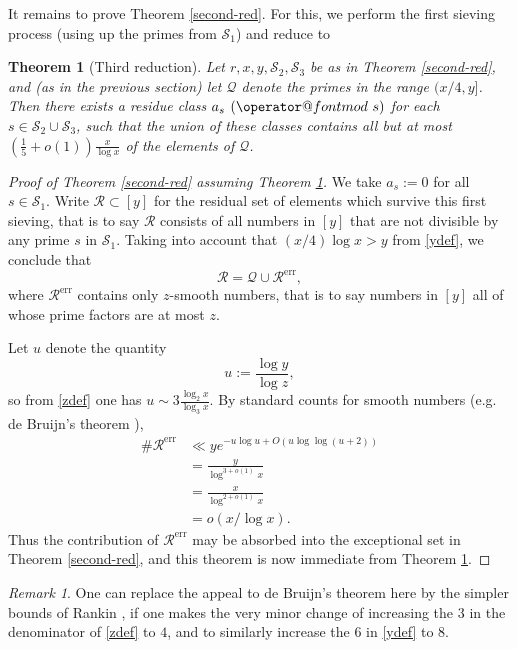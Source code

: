 \documentclass[11pt]{amsart}
\makeatletter
\numberwithin{equation}{section}  %
\theoremstyle{remark}
\newtheorem{remark}{Remark}
\theoremstyle{plain}
\newtheorem{thm}{Theorem}
\numberwithin{equation}{section}
\renewcommand{\pmod}[1]{\allowbreak\mkern7mu({\operator@font mod}\,\,#1)}
\renewcommand{\(}{\left(}
\renewcommand{\)}{\right)}
\newcommand{\asym}{\sim}   %
\newcommand{\QQ}{\mathcal{Q}}
\newcommand{\cS}{\mathcal{S}}
\newcommand{\cR}{\mathcal{R}}
\newcommand{\err}{\operatorname{err}}
\makeatother
\begin{document}
It remains to prove Theorem \ref{second-red}.  For this, we perform the first sieving process (using up the primes from $\cS_1$) and reduce to

\begin{thm}[Third reduction]\label{third-red}  Let $r,x,y,\cS_2,\cS_3$
  be as in Theorem \ref{second-red}, and (as in the previous section)
  let $\QQ$ denote the primes in the range $(x/4,y]$.  Then there
    exists a residue class $a_s \pmod s$ for each $s \in \cS_2 \cup
    \cS_3$, such that the union of these classes contains all but at most $(\frac{1}{5} + o(1)) \frac{x}{\log x}$ of the elements of $\QQ$.
\end{thm}

\begin{proof}[Proof of Theorem \ref{second-red} assuming Theorem \ref{third-red}]  We take $a_s := 0$ for all $s\in \cS_1$.
Write $\cR \subset [y]$ for the residual set of elements
which survive this first sieving, that is to say $\cR$ consists of all numbers in $[y]$ that are not divisible by any prime $s$ in $\cS_1$. Taking into account that
$(x/4)\log x>y$ from \eqref{ydef}, we conclude that 
$$\cR = \QQ \cup \cR^{\err},$$
where $\cR^{\err}$ contains only $z$-smooth
  numbers, that is to say numbers in $[y]$ all of
  whose prime factors are at most $z$.

Let $u$ denote the quantity
$$ u := \frac{\log y}{\log z},$$
so from \eqref{zdef} one has $u \asym 3 \frac{\log_2 x}{\log_3 x}$.  
By standard counts for smooth numbers (e.g. de Bruijn's theorem \cite{deB}),
\begin{align*}
\# \cR^{\err}  &\ll y e^{-u\log u + O( u \log\log(u+2) ) } \\
&= \frac{y}{\log^{3+o(1)} x} \\
&= \frac{x}{\log^{2+o(1)} x} \\
&= o( x/\log x).
\end{align*}
Thus the contribution of $\cR^{\err}$ may be absorbed into the exceptional set in Theorem \ref{second-red}, and this theorem is now immediate from Theorem \ref{third-red}.
\end{proof}

\begin{remark} One can replace the appeal to de Bruijn's theorem here by the simpler bounds of Rankin \cite[Lemma II]{R1}, if one makes the very minor change of increasing the $3$ in the denominator of \eqref{zdef} to $4$, and to similarly increase the $6$ in \eqref{ydef} to $8$. 
\end{remark}
\end{document}
